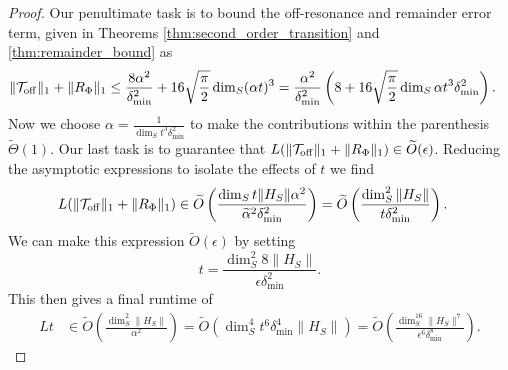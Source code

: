 \documentclass{article}
\newcommand{\off}{\rm off}
\newcommand{\parens}[1]{\left( #1 \right)}
\newcommand{\norm}[1]{\| #1 \|}
\newcommand{\TT}{\mathcal{T}}
\begin{document}
\begin{proof}
Our penultimate task is to bound the off-resonance and remainder error term, given in Theorems \ref{thm:second_order_transition} and \ref{thm:remainder_bound} as
\begin{align}
    \norm{\TT_{\off}}_1 + \norm{R_{\Phi}}_1 &\le \frac{8 \alpha^2}{\delta_{\min}^2} + 16 \sqrt{\frac{\pi}{2}} \dim_S (\alpha t)^3 = \frac{\alpha^2}{\delta_{\min}^2} \left(8 + 16 \sqrt{\frac{\pi}{2}} \dim_S \alpha t^3 \delta_{\min}^2 \right).
\end{align}
Now we choose $\alpha = \frac{1}{\dim_S t^3 \delta_{\min}^2}$ to make the contributions within the parenthesis $\widetilde{\Theta}(1)$. Our last task is to guarantee that $L(\norm{\TT_{\off}}_1  + \norm{R_{\Phi}}_1) \in \widetilde{O}(\epsilon)$.
Reducing the asymptotic expressions to isolate the effects of $t$ we find
\begin{align}
    L(\norm{\TT_{\off}}_1  + \norm{R_{\Phi}}_1) &\in \widetilde{O}\parens{\frac{\dim_S t\norm{H_S} \alpha^2}{\widetilde{\alpha}^2 \delta_{\min}^2 }} = \widetilde{O}\parens{\frac{\dim_S^2 \norm{H_S}}{t \delta_{\min}^2 }}.
\end{align}
We can make this expression $\widetilde{O}(\epsilon)$ by setting
\begin{equation}
    t = \frac{\dim_S^2 8 \norm{H_S}}{\epsilon \delta_{\min}^2}.\label{eq:ground_state_prep_time}
\end{equation}
This then gives a final runtime of
\begin{align}
    Lt &\in \widetilde{O} \parens{\frac{\dim_S^2 \norm{H_S}}{\alpha^2}} = \widetilde{O} \parens{\dim_S^4 t^6 \delta_{\min}^4 \norm{H_S}} = \widetilde{O} \parens{\frac{\dim_S^{16} \norm{H_S}^7}{\epsilon^{6} \delta_{\min}^8}}.
\end{align}


\end{proof}
\end{document}
